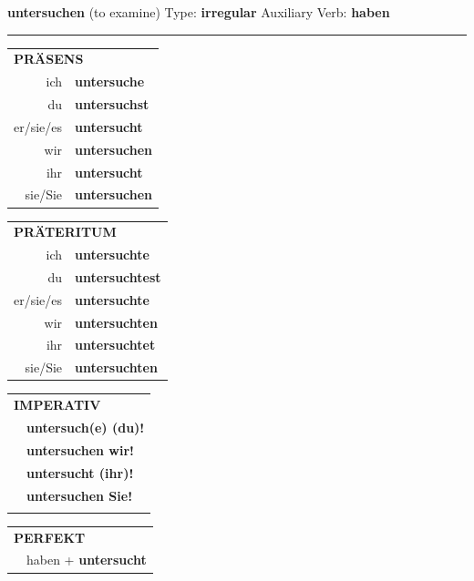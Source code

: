 \documentclass[10pt,a4paper]{revtex4-2}
\begin{document}
\begin{verbbox}
    {\Large \bf untersuchen} (to examine) \hfill Type: \textbf{irregular} \hfill Auxiliary Verb: \textbf{haben} 
    
     \vspace{5pt}

    \hrule
    
    \vspace{5pt}

  \begin{tabular}{rl}
     \multicolumn{2}{l}{\textbf{PRÄSENS} }\\
    ich & \textbf{untersuche}\\
    du & \textbf{untersuchst}\\
    er/sie/es & \textbf{untersucht}\\
    wir & \textbf{untersuchen}\\
    ihr & \textbf{untersucht}\\
    sie/Sie & \textbf{untersuchen}\\
  \end{tabular}
  \hfill
     \begin{tabular}{rl}
    \multicolumn{2}{l}{\textbf{PRÄTERITUM} }\\
    ich & \textbf{untersuchte}\\
    du & \textbf{untersuchtest}\\
    er/sie/es & \textbf{untersuchte}\\
    wir & \textbf{untersuchten}\\
    ihr & \textbf{untersuchtet}\\
    sie/Sie & \textbf{untersuchten}\\
  \end{tabular}
  \hfill
  \begin{tabular}{rl}
     \multicolumn{2}{l}{\textbf{IMPERATIV} }\\
   & \textbf{untersuch(e) (du)!}\\
   & \textbf{untersuchen wir!}\\
   & \textbf{untersucht (ihr)!}\\
   & \textbf{untersuchen Sie!}\\
   & \vspace{10pt}
  \end{tabular}

    \vspace{10pt}

 \begin{tabular}{rl}
     \multicolumn{2}{l}{\textbf{PERFEKT}}\\
   & haben + \textbf{untersucht}\\
  \end{tabular}
\hfill
   \begin{tabular}{rl}
   

\end{tabular}
\end{verbbox}
\end{document}
